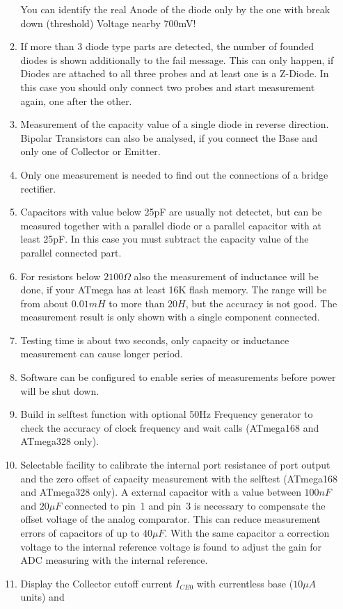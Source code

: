 \begin{enumerate}
\begin{enumerate}
You can identify the real Anode of the diode only by the one with break down (threshold) Voltage nearby 700mV!
\item If more than 3 diode type parts are detected, the number of founded diodes is shown additionally to the fail message.
 This can only happen, if Diodes are attached to all three probes and at least one is a Z-Diode.
In this case you should only connect two probes and start measurement again, one after the other.
\item Measurement of the capacity value of a single diode in reverse direction.
Bipolar Transistors can also be analysed, if you connect the Base and only one of Collector or Emitter.
\item Only one measurement is needed to find out the connections of a bridge rectifier.
\item Capacitors with value below 25pF are usually not detectet, but can be measured together with
a parallel diode or a parallel capacitor with at least 25pF.
In this case you must subtract the capacity value of the parallel connected part.
\item For resistors below \(2100 \Omega\) also the measurement of inductance will be done, if
your ATmega has at least 16K flash memory.
The range will be from about \(0.01 mH\) to more than \(20 H\), but the accuracy is not good.
The measurement result is only shown with a single component connected.
\item Testing time is about two seconds, only capacity or inductance measurement can cause longer period.
\item Software can be configured to enable series of measurements before power will be shut down.
\item Build in selftest function with optional 50Hz Frequency generator to check the accuracy of clock frequency and wait calls (ATmega168 and ATmega328 only).
\item Selectable facility to calibrate the internal port resistance of port output and
the zero offset of capacity measurement with the selftest (ATmega168 and ATmega328 only).
A external capacitor with a value between \(100 nF\) 
and \(20 \mu F\) connected to pin~1 and pin~3 is necessary to compensate the offset voltage of the analog comparator.
This can reduce measurement errors of capacitors of up to \(40 \mu F\).
With the same capacitor a correction voltage to the internal reference voltage is found to adjust the
gain for ADC measuring with the internal reference.
\item Display the Collector cutoff current \(I_{CE0}\) with currentless base (\(10\mu A\) units) and

\end{enumerate}
\end{enumerate}
